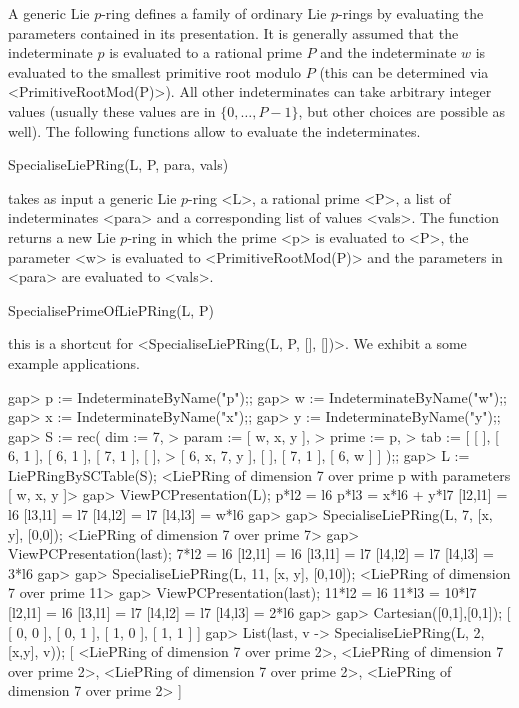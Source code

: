 
A generic Lie $p$-ring defines a family of ordinary Lie $p$-rings by 
evaluating the parameters contained in its presentation. It is generally 
assumed that the indeterminate $p$ is evaluated to a rational prime $P$ 
and the indeterminate $w$ is evaluated to the smallest primitive root 
modulo $P$ (this can be determined via <PrimitiveRootMod(P)>). All other 
indeterminates can take arbitrary integer values (usually these values are
in $\{0, \ldots, P-1\}$, but other choices are possible as well). The 
following functions allow to evaluate the indeterminates.

\> SpecialiseLiePRing(L, P, para, vals)

takes as input a generic Lie $p$-ring <L>, a rational prime <P>, 
a list of indeterminates <para> and a corresponding list of values
<vals>. The function returns a new Lie $p$-ring in which the prime 
<p> is evaluated to <P>, the parameter <w> is evaluated to 
<PrimitiveRootMod(P)> and the parameters in <para> are evaluated
to <vals>. 

\> SpecialisePrimeOfLiePRing(L, P)

this is a shortcut for <SpecialiseLiePRing(L, P, [], [])>. We exhibit
a some example applications.

\beginexample
gap> p := IndeterminateByName("p");;
gap> w := IndeterminateByName("w");;
gap> x := IndeterminateByName("x");;
gap> y := IndeterminateByName("y");;
gap> S := rec( dim := 7, 
>              param := [ w, x, y ], 
>              prime := p, 
>              tab := [ [  ], [ 6, 1 ], [ 6, 1 ], [ 7, 1 ], [  ], 
>                       [ 6, x, 7, y ], [  ], [ 7, 1 ], [ 6, w ] ] );;
gap> L := LiePRingBySCTable(S);
<LiePRing of dimension 7 over prime p with parameters [ w, x, y ]>
gap> ViewPCPresentation(L);
p*l2 = l6
p*l3 = x*l6 + y*l7
[l2,l1] = l6
[l3,l1] = l7
[l4,l2] = l7
[l4,l3] = w*l6
gap>  
gap> SpecialiseLiePRing(L, 7, [x, y], [0,0]);
<LiePRing of dimension 7 over prime 7>
gap> ViewPCPresentation(last);
7*l2 = l6
[l2,l1] = l6
[l3,l1] = l7
[l4,l2] = l7
[l4,l3] = 3*l6
gap> 
gap> SpecialiseLiePRing(L, 11, [x, y], [0,10]);
<LiePRing of dimension 7 over prime 11>
gap> ViewPCPresentation(last);
11*l2 = l6
11*l3 = 10*l7
[l2,l1] = l6
[l3,l1] = l7
[l4,l2] = l7
[l4,l3] = 2*l6
gap> 
gap> Cartesian([0,1],[0,1]);
[ [ 0, 0 ], [ 0, 1 ], [ 1, 0 ], [ 1, 1 ] ]
gap> List(last, v -> SpecialiseLiePRing(L, 2, [x,y], v));
[ <LiePRing of dimension 7 over prime 2>, 
  <LiePRing of dimension 7 over prime 2>, 
  <LiePRing of dimension 7 over prime 2>, 
  <LiePRing of dimension 7 over prime 2> ]
\endexample

